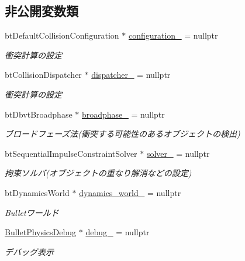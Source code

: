 \subsection*{非公開変数類}
\begin{DoxyCompactItemize}
\item 
bt\+Default\+Collision\+Configuration $\ast$ \mbox{\hyperlink{class_bullet_physics_manager_afb7550b9dfffd2731572aada4f0af008}{configuration\+\_\+}} = nullptr
\begin{DoxyCompactList}\small\item\em 衝突計算の設定 \end{DoxyCompactList}\item 
bt\+Collision\+Dispatcher $\ast$ \mbox{\hyperlink{class_bullet_physics_manager_a07ff9dde66b009362afeed24a8dab84c}{dispatcher\+\_\+}} = nullptr
\begin{DoxyCompactList}\small\item\em 衝突計算の設定 \end{DoxyCompactList}\item 
bt\+Dbvt\+Broadphase $\ast$ \mbox{\hyperlink{class_bullet_physics_manager_a991c738496cfd117c9a7f43f6bcf4003}{broadphase\+\_\+}} = nullptr
\begin{DoxyCompactList}\small\item\em ブロードフェーズ法(衝突する可能性のあるオブジェクトの検出) \end{DoxyCompactList}\item 
bt\+Sequential\+Impulse\+Constraint\+Solver $\ast$ \mbox{\hyperlink{class_bullet_physics_manager_ab6bcf584643b13be7d96e266fc183ebe}{solver\+\_\+}} = nullptr
\begin{DoxyCompactList}\small\item\em 拘束ソルバ(オブジェクトの重なり解消などの設定) \end{DoxyCompactList}\item 
bt\+Dynamics\+World $\ast$ \mbox{\hyperlink{class_bullet_physics_manager_acd0e088adad3c0cc032fea67a2bcef10}{dynamics\+\_\+world\+\_\+}} = nullptr
\begin{DoxyCompactList}\small\item\em Bulletワールド \end{DoxyCompactList}\item 
\mbox{\hyperlink{class_bullet_physics_debug}{Bullet\+Physics\+Debug}} $\ast$ \mbox{\hyperlink{class_bullet_physics_manager_a055f728a5094a128f7ba2e6c8ec75433}{debug\+\_\+}} = nullptr
\begin{DoxyCompactList}\small\item\em デバッグ表示 \end{DoxyCompactList}\item 

\end{DoxyCompactItemize}
